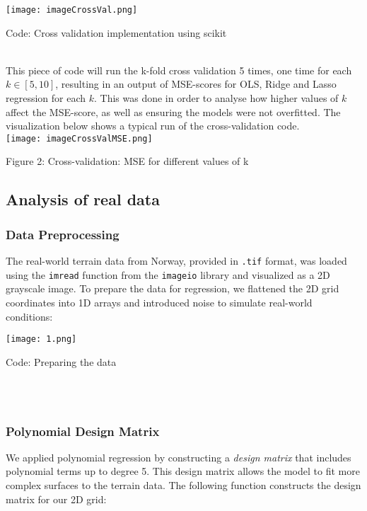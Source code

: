 \documentclass{article}
\begin{document}
\begin{enumerate}
\texttt{[image: imageCrossVal.png]}
\caption{Code: \cite{scikit-learn} Cross validation implementation using scikit}
\label{fig:enter-label}\\

This piece of code will run the k-fold cross validation 5 times, one time for each \( k \in [5,10]\), resulting in an output of MSE-scores for OLS, Ridge and Lasso regression for each \(k\). This was done in order to analyse how higher values of \(k\) affect the MSE-score, as well as ensuring the models were not overfitted. The visualization below shows a typical run of the cross-validation code.\\


\texttt{[image: imageCrossValMSE.png]}
\caption{Figure 2: Cross-validation: MSE for different values of k}
\label{fig:enter-label}


   




\subsection{Analysis of real data}

\subsubsection{Data Preprocessing}

The real-world terrain data from Norway, provided in \texttt{.tif} format, was loaded using the \texttt{imread} function from the \texttt{imageio} library and visualized as a 2D grayscale image. To prepare the data for regression, we flattened the 2D grid coordinates into 1D arrays and introduced noise to simulate real-world conditions:

\texttt{[image: 1.png]}
\caption{Code: Preparing the data }
\label{fig:enter-label}\\\\


\subsubsection{Polynomial Design Matrix}

We applied polynomial regression by constructing a \textit{design matrix} that includes polynomial terms up to degree 5. This design matrix allows the model to fit more complex surfaces to the terrain data. The following function constructs the design matrix for our 2D grid:


\end{enumerate}
\end{document}
